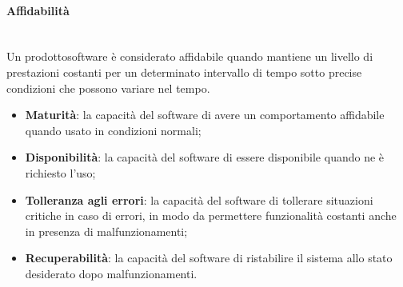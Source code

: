 	\paragraph{Affidabilità} \mbox{}\\
	Un prodotto\glosp software è considerato affidabile quando mantiene un livello di prestazioni costanti per un determinato intervallo di tempo sotto precise condizioni che possono variare nel tempo.
	\begin{itemize}
		\item \textbf{Maturità}: la capacità del software di avere un comportamento affidabile quando usato in condizioni normali;
		\item \textbf{Disponibilità}: la capacità del software di essere disponibile quando ne è richiesto l'uso;
		\item \textbf{Tolleranza agli errori}: la capacità del software di tollerare situazioni critiche in caso di errori, in modo da permettere funzionalità costanti anche in presenza di malfunzionamenti;
		\item \textbf{Recuperabilità}: la capacità del software di ristabilire il sistema allo stato desiderato dopo malfunzionamenti.
	\end{itemize}
